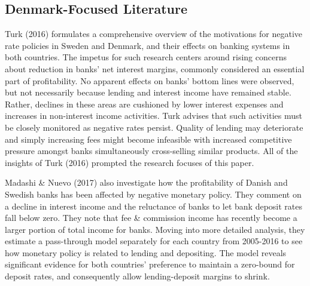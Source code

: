 \documentclass[10pt]{article} %
\begin{document}
\subsection{Denmark-Focused Literature}

Turk (2016) formulates a comprehensive overview of the motivations for negative rate policies in Sweden and Denmark, and their effects on banking systems in both countries. The impetus for such research centers around rising concerns about reduction in banks' net interest margins, commonly considered an essential part of profitability. No apparent effects on banks' bottom lines were observed, but not necessarily because lending and interest income have remained stable. Rather, declines in these areas are cushioned by lower interest expenses and increases in non-interest income activities. Turk advises that such activities must be closely monitored as negative rates persist. Quality of lending may deteriorate and simply increasing fees might become infeasible with increased competitive pressure amongst banks simultaneously cross-selling similar products. All of the insights of Turk (2016) prompted the research focuses of this paper.

Madashi \& Nuevo (2017) also investigate how the profitability of Danish and Swedish banks has been affected by negative monetary policy. They comment on a decline in interest income and the reluctance of banks to let bank deposit rates fall below zero. They note that fee \& commission income has recently become a larger portion of total income for banks. Moving into more detailed analysis, they estimate a pass-through model separately for each country from 2005-2016 to see how monetary policy is related to lending and depositing. The model reveals significant evidence for both countries' preference to maintain a zero-bound for deposit rates, and consequently allow lending-deposit margins to shrink. 
\end{document}
